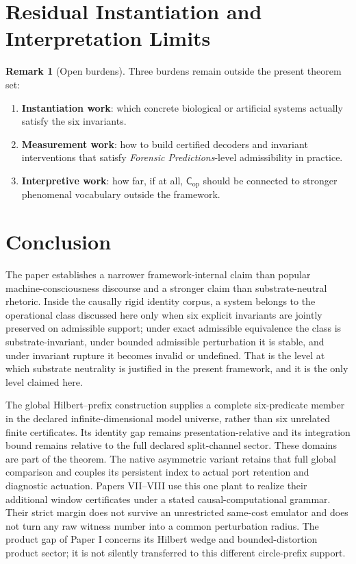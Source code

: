 \documentclass[11pt,a4paper]{article}
\theoremstyle{definition}
\newtheorem{remark}[theorem]{Remark}
\newcommand{\Cop}{\mathsf{C}_{\mathrm{op}}}
\begin{document}
\section{Residual Instantiation and Interpretation Limits}
\begin{remark}[Open burdens]
Three burdens remain outside the present theorem set:
\begin{enumerate}[leftmargin=1.5em,itemsep=0.15em]
\item \textbf{Instantiation work}: which concrete biological or artificial systems actually satisfy the six invariants.
\item \textbf{Measurement work}: how to build certified decoders and invariant interventions that satisfy \textit{Forensic Predictions}-level admissibility in practice.
\item \textbf{Interpretive work}: how far, if at all, $\Cop$ should be connected to stronger phenomenal vocabulary outside the framework.
\end{enumerate}
\end{remark}

\section{Conclusion}
The paper establishes a narrower framework-internal claim than popular machine-consciousness discourse and a stronger claim than substrate-neutral rhetoric. Inside the causally rigid identity corpus, a system belongs to the operational class discussed here only when six explicit invariants are jointly preserved on admissible support; under exact admissible equivalence the class is substrate-invariant, under bounded admissible perturbation it is stable, and under invariant rupture it becomes invalid or undefined. That is the level at which substrate neutrality is justified in the present framework, and it is the only level claimed here.

The global Hilbert--prefix construction supplies a complete six-predicate member in the declared infinite-dimensional model universe, rather than six unrelated finite certificates. Its identity gap remains presentation-relative and its integration bound remains relative to the full declared split-channel sector. These domains are part of the theorem.
The native asymmetric variant retains that full global comparison and couples
its persistent index to actual port retention and diagnostic actuation.
Papers VII--VIII use this one plant to realize their additional window
certificates under a stated causal-computational grammar. Their strict margin
does not survive an unrestricted same-cost emulator and does not turn any
raw witness number into a common perturbation radius. The product gap of
Paper I concerns its Hilbert wedge and bounded-distortion product sector;
it is not silently transferred to this different circle-prefix support.
\end{document}
